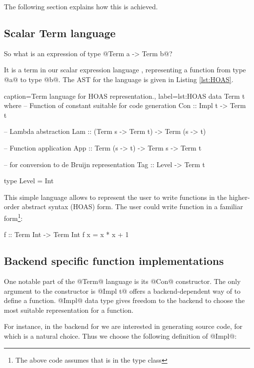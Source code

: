 \documentclass[preamble.tex]{subfiles}
\begin{document}
The following section explains how this is achieved.

\subsection{Scalar Term language}

So what is an expression of type @Term a -> Term b@?

It is a term in our scalar expression language , representing a function from type @a@ to type @b@. The AST for the  language is given in Listing \ref{lst:HOAS}.

\begin{hscode2}{%
    caption={Term language for HOAS representation.},%
    label=lst:HOAS}
data Term t where
  -- Function of constant suitable for code generation
  Con :: Impl t -> Term t

  -- Lambda abstraction
  Lam :: (Term s -> Term t) -> Term (s -> t)

  -- Function application
  App :: Term (s -> t) -> Term s -> Term t

  -- for conversion to de Bruijn representation
  Tag :: Level -> Term t

type Level = Int
\end{hscode2}

This simple language allows to represent the user to write functions in the higher-order abstract syntax (HOAS) form. The user could write function in a familiar form\footnote{The above code assumes that  is in the type class }:

\begin{hscode}
f :: Term Int -> Term Int
f x = x * x + 1
\end{hscode}



\subsection{Backend specific function implementations}

One notable part of the @Term@ language is its @Con@ constructor. The only argument to the constructor is @Impl t@ offers a backend-dependent way of to define a function. @Impl@ data type gives freedom to the backend to choose the most suitable representation for a function.

For instance, in the \Haskell backend for \LiveFusion we are interested in generating \Haskell source code, for which  \cite{TH} is a natural choice. Thus we choose the following definition of @Impl@:
\end{document}
